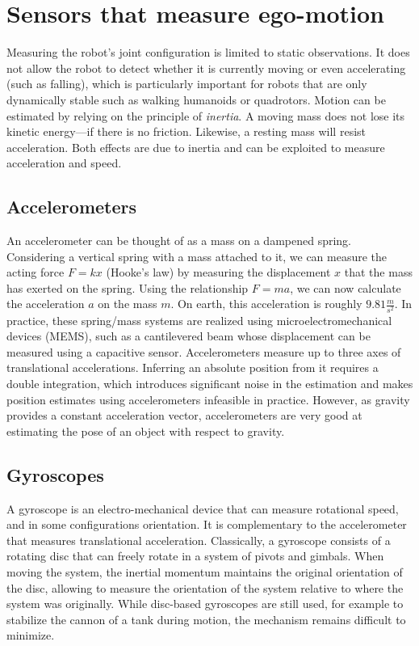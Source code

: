 \section{Sensors that measure ego-motion}\label{sec:sensors:inertia}

Measuring the robot's joint configuration is limited to static observations. It does not allow the robot to detect whether it is currently moving or even accelerating (such as falling), which is particularly important for robots that are only dynamically stable such as walking humanoids or quadrotors. Motion can be estimated by relying on the principle of \emph{inertia}. A moving mass does not lose its kinetic energy---if there is no friction. Likewise, a resting mass will resist acceleration. Both effects are due to inertia  and can be exploited to measure acceleration and speed.

\subsection{Accelerometers}

An accelerometer can be thought of as a mass on a dampened spring. Considering a vertical spring with a mass attached to it, we can measure the acting force $F=kx$ (Hooke's law) by measuring the displacement $x$ that the mass has exerted on the spring.
Using the relationship $F=ma$, we can now calculate the acceleration $a$ on the mass $m$. On earth, this acceleration is roughly $9.81\frac{m}{s^2}$.
In practice, these spring/mass systems are realized using microelectromechanical devices (MEMS), such as a cantilevered beam whose displacement can be measured using a capacitive sensor. Accelerometers measure up to three axes of translational accelerations. Inferring an absolute position from it requires a double integration, which introduces significant noise in the estimation and makes position estimates using accelerometers infeasible in practice.
However, as gravity provides a constant acceleration vector, accelerometers are very good at estimating the pose of an object with respect to gravity.

\subsection{Gyroscopes}\label{sec:gyroscopes}

A gyroscope is an electro-mechanical device that can measure rotational speed, and in some configurations orientation. It is complementary to the accelerometer that measures translational acceleration. Classically, a gyroscope consists of a rotating disc that can freely rotate in a system of pivots and gimbals. When moving the system, the inertial momentum maintains the original orientation of the disc, allowing to measure the orientation of the system relative to where the system was originally. While disc-based gyroscopes are still used, for example to stabilize the cannon of a tank during motion, the mechanism remains difficult to minimize.

